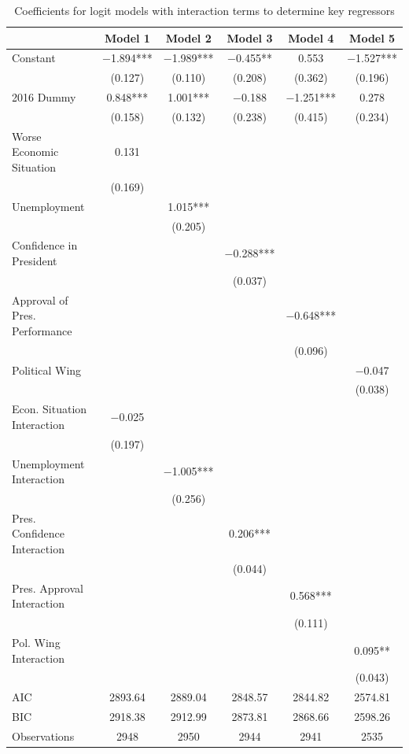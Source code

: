 \documentclass[floatsintext,man]{apa7}\usepackage[]{graphicx}\usepackage[]{color}
\begin{document}
\begin{table}[htbp]
\begin{center}
\caption{Coefficients for logit models with interaction terms to determine key regressors}
\label{tab:simplemodel}
\renewcommand{\arraystretch}{0.6}

\begin{tabular}[t]{lccccc}
\toprule
  & Model 1 & Model 2 & Model 3 & Model 4 & Model 5\\
\midrule
Constant & \num{-1.894}*** & \num{-1.989}*** & \num{-0.455}** & \num{0.553} & \num{-1.527}***\\
 & (\num{0.127}) & (\num{0.110}) & (\num{0.208}) & (\num{0.362}) & (\num{0.196})\\
2016 Dummy & \num{0.848}*** & \num{1.001}*** & \num{-0.188} & \num{-1.251}*** & \num{0.278}\\
 & (\num{0.158}) & (\num{0.132}) & (\num{0.238}) & (\num{0.415}) & (\num{0.234})\\
Worse Economic Situation & \num{0.131} &  &  &  & \\
 & (\num{0.169}) &  &  &  & \\
Unemployment &  & \num{1.015}*** &  &  & \\
 &  & (\num{0.205}) &  &  & \\
Confidence in President &  &  & \num{-0.288}*** &  & \\
 &  &  & (\num{0.037}) &  & \\
Approval of Pres. Performance &  &  &  & \num{-0.648}*** & \\
 &  &  &  & (\num{0.096}) & \\
Political Wing &  &  &  &  & \num{-0.047}\\
 &  &  &  &  & (\num{0.038})\\
Econ. Situation Interaction & \num{-0.025} &  &  &  & \\
 & (\num{0.197}) &  &  &  & \\
Unemployment Interaction &  & \num{-1.005}*** &  &  & \\
 &  & (\num{0.256}) &  &  & \\
Pres. Confidence Interaction &  &  & \num{0.206}*** &  & \\
 &  &  & (\num{0.044}) &  & \\
Pres. Approval Interaction &  &  &  & \num{0.568}*** & \\
 &  &  &  & (\num{0.111}) & \\
Pol. Wing Interaction &  &  &  &  & \num{0.095}**\\
 &  &  &  &  & (\num{0.043})\\
\midrule
AIC & \num{2893.64} & \num{2889.04} & \num{2848.57} & \num{2844.82} & \num{2574.81}\\
BIC & \num{2918.38} & \num{2912.99} & \num{2873.81} & \num{2868.66} & \num{2598.26}\\
Observations & 2948 & 2950 & 2944 & 2941 & 2535\\
\bottomrule
\end{tabular}



\end{center}
\end{table}
\end{document}
